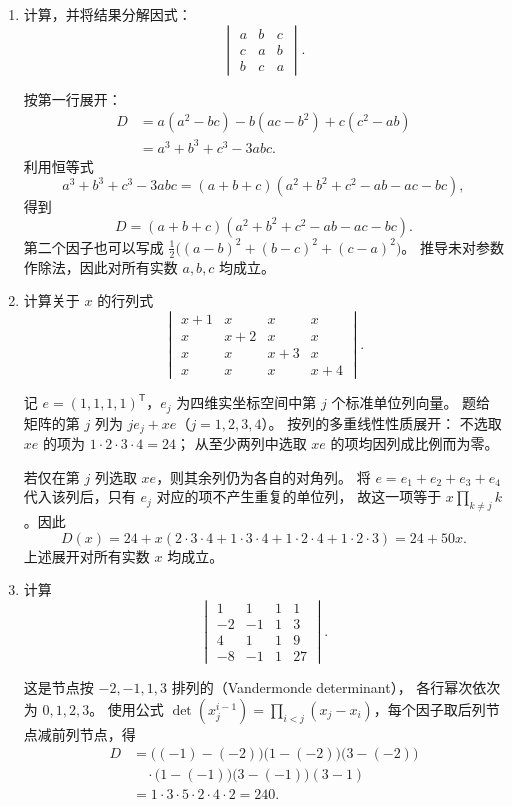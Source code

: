\documentclass[UTF8,12pt,a4paper,fontset=fandol]{ctexart}
\begin{document}
\begin{enumerate}[label=\arabic*.]
\item\label{q:detcalc-cyclic-three}
计算，并将结果分解因式：
\[
\begin{vmatrix}
a&b&c\\
c&a&b\\
b&c&a
\end{vmatrix}.
\]

\begin{solve}
按第一行展开：
\begin{align*}
D&=a(a^2-bc)-b(ac-b^2)+c(c^2-ab)\\
&=a^3+b^3+c^3-3abc.
\end{align*}
利用恒等式
\[
a^3+b^3+c^3-3abc
=(a+b+c)(a^2+b^2+c^2-ab-ac-bc),
\]
得到
\[
\boxed{D=(a+b+c)(a^2+b^2+c^2-ab-ac-bc).}
\]
第二个因子也可以写成
$\tfrac12\bigl((a-b)^2+(b-c)^2+(c-a)^2\bigr)$。
推导未对参数作除法，因此对所有实数 $a,b,c$ 均成立。
\end{solve}

\item\label{q:detcalc-parameter}
计算关于 $x$ 的行列式
\[
\begin{vmatrix}
x+1&x&x&x\\
x&x+2&x&x\\
x&x&x+3&x\\
x&x&x&x+4
\end{vmatrix}.
\]

\begin{solve}
记 $e=(1,1,1,1)^{\mathsf T}$，$e_j$ 为四维实坐标空间中第 $j$ 个标准单位列向量。
题给矩阵的第 $j$ 列为 $je_j+xe$（$j=1,2,3,4$）。
按列的多重线性性质展开：
不选取 $xe$ 的项为 $1\cdot2\cdot3\cdot4=24$；
从至少两列中选取 $xe$ 的项均因列成比例而为零。

若仅在第 $j$ 列选取 $xe$，则其余列仍为各自的对角列。
将 $e=e_1+e_2+e_3+e_4$ 代入该列后，只有 $e_j$ 对应的项不产生重复的单位列，
故这一项等于 $x\prod_{k\ne j}k$。因此
\[
D(x)=24+x(2\cdot3\cdot4+1\cdot3\cdot4+1\cdot2\cdot4+1\cdot2\cdot3)
=\boxed{24+50x}.
\]
上述展开对所有实数 $x$ 均成立。
\end{solve}

\item\label{q:detcalc-powers}
计算
\[
\begin{vmatrix}
1&1&1&1\\
-2&-1&1&3\\
4&1&1&9\\
-8&-1&1&27
\end{vmatrix}.
\]

\begin{solve}
这是节点按 $-2,-1,1,3$ 排列的（Vandermonde determinant），
各行幂次依次为 $0,1,2,3$。
使用公式 $\det(x_j^{i-1})=\prod_{i<j}(x_j-x_i)$，每个因子取后列节点减前列节点，得
\begin{align*}
D&=\bigl((-1)-(-2)\bigr)\bigl(1-(-2)\bigr)\bigl(3-(-2)\bigr)\\
&\quad\cdot\bigl(1-(-1)\bigr)\bigl(3-(-1)\bigr)(3-1)\\
&=1\cdot3\cdot5\cdot2\cdot4\cdot2=\boxed{240}.
\end{align*}
\end{solve}


\end{enumerate}
\end{document}
